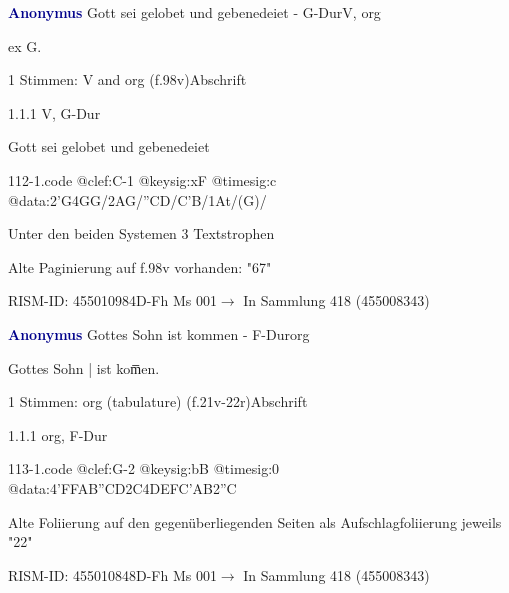 \documentclass[twocolumn, 12pt]{book}
\begin{document}
\par \vspace{16pt} \textcolor{darkblue}{\textbf{Anonymus  }}\hfillplus{\textbf{[112]}}\newline Gott sei gelobet und gebenedeiet - G-Dur\newline V, org
\par \begin{itshape}[f.96r, at left:] ex G.\end{itshape} 
\par \textcolor{darkblue}{}  1 Stimmen: V and org  (f.98v)\newline Abschrift
\par 1.1.1  V, G-Dur\newline \begin{footnotesize} Gott sei gelobet und gebenedeiet \end{footnotesize}  
\begin{filecontents*}{112-1.code}
@clef:C-1
@keysig:xF
@timesig:c
@data:2'G4GG/2AG/''CD/C'B/1At/(G)/
\end{filecontents*}
\newline %
\par Unter den beiden Systemen 3 Textstrophen
\par Alte Paginierung auf f.98v vorhanden: "67"
\par RISM-ID: 455010984\newline D-Fh  Ms 001\newline $\rightarrow$ In Sammlung 418 (455008343)
      
\par \vspace{16pt} \textcolor{darkblue}{\textbf{Anonymus  }}\hfillplus{\textbf{[113]}}\newline Gottes Sohn ist kommen - F-Dur\newline org
\par \begin{itshape}[f.21v, at left:] Gottes Sohn | ist kom̅en.\end{itshape} 
\par \textcolor{darkblue}{}  1 Stimmen: org (tabulature)  (f.21v-22r)\newline Abschrift
\par 1.1.1  org, F-Dur  
\begin{filecontents*}{113-1.code}
@clef:G-2
@keysig:bB
@timesig:0
@data:4'FFAB''CD2C4DEFC'AB2''C
\end{filecontents*}
\newline %
\par Alte Foliierung auf den gegenüberliegenden Seiten als Aufschlagfoliierung jeweils "22"
\par RISM-ID: 455010848\newline D-Fh  Ms 001\newline $\rightarrow$ In Sammlung 418 (455008343)
      
\end{document}

